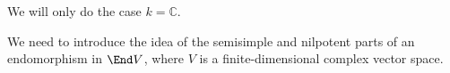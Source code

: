 We will only do the case $k = \mathbb{C}$.

We need to introduce the idea of the semisimple and nilpotent parts of an
endomorphism in $\End V$, where $V$ is a finite-dimensional complex vector
space.
